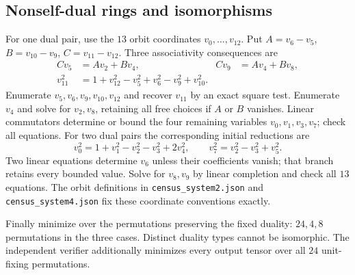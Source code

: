 \subsection{Nonself-dual rings and isomorphisms}
For one dual pair, use the $13$ orbit coordinates $v_0,\ldots,v_{12}$.
Put $A=v_6-v_5$, $B=v_{10}-v_9$, $C=v_{11}-v_{12}$.
Three associativity consequences are
\begin{align*}
Cv_5&=Av_2+Bv_4,& Cv_9&=Av_4+Bv_8,\\
v_{11}^2&=1+v_{12}^2-v_5^2+v_6^2-v_9^2+v_{10}^2.
\end{align*}
Enumerate $v_5,v_6,v_9,v_{10},v_{12}$ and recover $v_{11}$ by an exact
square test. Enumerate $v_4$ and solve for $v_2,v_8$, retaining all free
choices if $A$ or $B$ vanishes. Linear commutators determine or bound
the four remaining variables $v_0,v_1,v_3,v_7$; check all equations.
For two dual pairs the corresponding initial reductions are
\[
v_0^2=1+v_1^2-v_2^2-v_3^2+2v_4^2,\qquad
v_7^2=v_2^2-v_3^2+v_5^2.
\]
Two linear equations determine $v_6$ unless their coefficients vanish;
that branch retains every bounded value. Solve for $v_8,v_9$ by linear
completion and check all $13$ equations. The orbit definitions in
\texttt{census\_system2.json} and \texttt{census\_system4.json} fix these
coordinate conventions exactly.

Finally minimize over the permutations preserving the fixed duality:
$24,4,8$ permutations in the three cases. Distinct duality types cannot
be isomorphic. The independent verifier additionally minimizes every
output tensor over all $24$ unit-fixing permutations.


